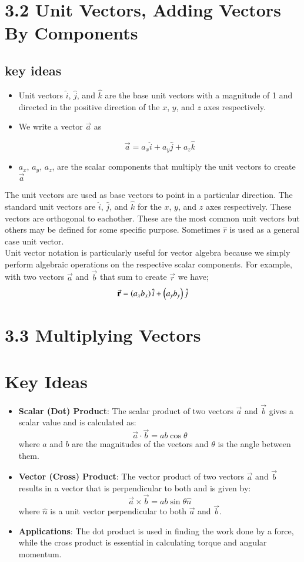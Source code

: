 \documentclass{article}
\begin{document}
\section*{3.2 Unit Vectors, Adding Vectors By Components}
\subsection*{key ideas}
\begin{itemize}
	\item Unit vectors $\hat{i}$, $\hat{j}$, and $\hat{k}$ are the base unit vectors with a magnitude of 1 and directed in the positive direction of the $x$, $y$, and $z$ axes respectively.
	\item We write a vector $\vec{a}$ as

	\[
		\vec{a} = a_x \hat{i} + a_y \hat{j} + a_z \hat{k}
	\]
	\item $a_x$, $a_y$, $a_z$, are the scalar components that multiply the unit vectors to create $\vec{a}$
\end{itemize}
The unit vectors are used as base vectors to point in a particular direction.
The standard unit vectors are $\hat{i}$, $\hat{j}$, and $\hat{k}$ for the $x$, $y$, and $z$ axes respectively.
These vectors are orthogonal to eachother.
These are the most common unit vectors but others may be defined for some specific purpose. Sometimes $\hat{r}$ is used as a general case unit vector.\vspace{12pt} \\
Unit vector notation is particularly useful for vector algebra because we simply perform algebraic operations on the respective scalar components.
For example, with two vectors $\vec{a}$ and $\vec{b}$ that sum to create $\vec{r}$ we have;
\[
	\va r = \left(a_x b_x\right)\hat{i} + \left(a_y b_y\right)\hat{j}
\]

\section*{3.3 Multiplying Vectors}
\section*{Key Ideas}
\begin{itemize}
    \item \textbf{Scalar (Dot) Product}: The scalar product of two vectors $\vec{a}$ and $\vec{b}$ gives a scalar value and is calculated as:
    \[
    \vec{a} \cdot \vec{b} = ab \cos \theta
    \]
    where $a$ and $b$ are the magnitudes of the vectors and $\theta$ is the angle between them.
    \item \textbf{Vector (Cross) Product}: The vector product of two vectors $\vec{a}$ and $\vec{b}$ results in a vector that is perpendicular to both and is given by:
    \[
    \vec{a} \times \vec{b} = ab \sin \theta \hat{n}
    \]
    where $\hat{n}$ is a unit vector perpendicular to both $\vec{a}$ and $\vec{b}$.
    \item \textbf{Applications}: The dot product is used in finding the work done by a force, while the cross product is essential in calculating torque and angular momentum.
\end{itemize}
\end{document}
